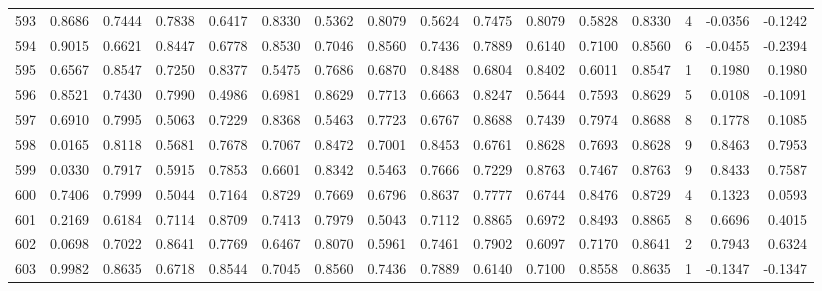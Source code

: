 \begin{tabular}{lrrrrrrrrrrrrrrr}
593 &      0.8686 &  0.7444 &  0.7838 &  0.6417 &  0.8330 &  0.5362 &  0.8079 &  0.5624 &  0.7475 &  0.8079 &   0.5828 &     0.8330 &      4 &                   -0.0356 &                    -0.1242 \\
594 &      0.9015 &  0.6621 &  0.8447 &  0.6778 &  0.8530 &  0.7046 &  0.8560 &  0.7436 &  0.7889 &  0.6140 &   0.7100 &     0.8560 &      6 &                   -0.0455 &                    -0.2394 \\
595 &      0.6567 &  0.8547 &  0.7250 &  0.8377 &  0.5475 &  0.7686 &  0.6870 &  0.8488 &  0.6804 &  0.8402 &   0.6011 &     0.8547 &      1 &                    0.1980 &                     0.1980 \\
596 &      0.8521 &  0.7430 &  0.7990 &  0.4986 &  0.6981 &  0.8629 &  0.7713 &  0.6663 &  0.8247 &  0.5644 &   0.7593 &     0.8629 &      5 &                    0.0108 &                    -0.1091 \\
597 &      0.6910 &  0.7995 &  0.5063 &  0.7229 &  0.8368 &  0.5463 &  0.7723 &  0.6767 &  0.8688 &  0.7439 &   0.7974 &     0.8688 &      8 &                    0.1778 &                     0.1085 \\
598 &      0.0165 &  0.8118 &  0.5681 &  0.7678 &  0.7067 &  0.8472 &  0.7001 &  0.8453 &  0.6761 &  0.8628 &   0.7693 &     0.8628 &      9 &                    0.8463 &                     0.7953 \\
599 &      0.0330 &  0.7917 &  0.5915 &  0.7853 &  0.6601 &  0.8342 &  0.5463 &  0.7666 &  0.7229 &  0.8763 &   0.7467 &     0.8763 &      9 &                    0.8433 &                     0.7587 \\
600 &      0.7406 &  0.7999 &  0.5044 &  0.7164 &  0.8729 &  0.7669 &  0.6796 &  0.8637 &  0.7777 &  0.6744 &   0.8476 &     0.8729 &      4 &                    0.1323 &                     0.0593 \\
601 &      0.2169 &  0.6184 &  0.7114 &  0.8709 &  0.7413 &  0.7979 &  0.5043 &  0.7112 &  0.8865 &  0.6972 &   0.8493 &     0.8865 &      8 &                    0.6696 &                     0.4015 \\
602 &      0.0698 &  0.7022 &  0.8641 &  0.7769 &  0.6467 &  0.8070 &  0.5961 &  0.7461 &  0.7902 &  0.6097 &   0.7170 &     0.8641 &      2 &                    0.7943 &                     0.6324 \\
603 &      0.9982 &  0.8635 &  0.6718 &  0.8544 &  0.7045 &  0.8560 &  0.7436 &  0.7889 &  0.6140 &  0.7100 &   0.8558 &     0.8635 &      1 &                   -0.1347 &                    -0.1347 \\

\end{tabular}
